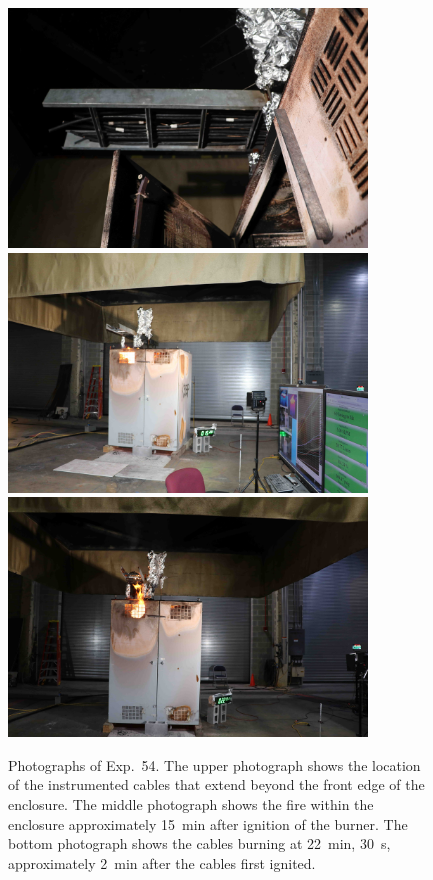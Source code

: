 \begin{figure}[p]
\centering
\includegraphics[height=2.50in]{../FIGURES/Test_54_cables} \\ \vspace{0.1in}
\includegraphics[height=2.50in]{../FIGURES/Test_54_15_min_20_s} \\ \vspace{0.1in}
\includegraphics[height=2.50in]{../FIGURES/Test_54_22_min_31_s}
\caption[Photographs of Exp.~54]{Photographs of Exp.~54. The upper photograph shows the location of the instrumented cables that extend beyond the front edge of the enclosure. The middle photograph shows the fire within the enclosure approximately 15~min after ignition of the burner. The bottom photograph shows the cables burning at 22~min, 30~s, approximately 2~min after the cables first ignited.}
\label{fig:Test_54_photos}
\end{figure}


